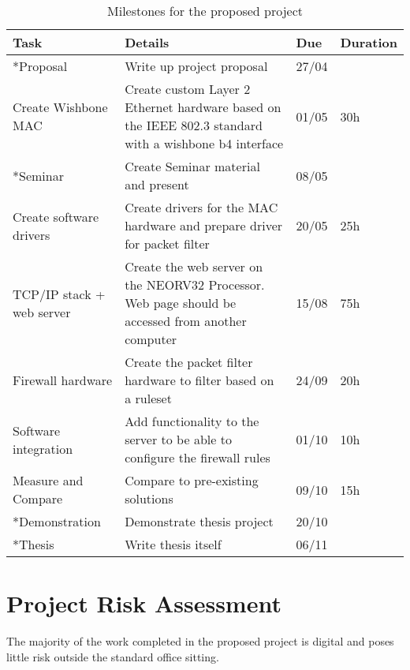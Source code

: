 \begin{table}[hbt!]
\centering%
    \begin{tabularx}{\textwidth}{ lXll }
        \hline
        Task                            & Details & Due & Duration  \\ \hline
        *Proposal                        & Write up project proposal & 27/04 & \\
        Create Wishbone MAC             &  Create custom Layer 2 Ethernet hardware based on the IEEE 802.3 standard with a wishbone b4 interface & 01/05  & 30h \\
        *Seminar                         & Create Seminar material and present & 08/05 & \\
        Create software drivers         & Create drivers for the MAC hardware and prepare driver for packet filter & 20/05 & 25h \\
        TCP/IP stack + web server       &  Create the web server on the NEORV32 Processor. Web page should be accessed from another computer  & 15/08     & 75h \\ 
        Firewall hardware               &  Create the packet filter hardware to filter based on a ruleset & 24/09    & 20h \\ 
        Software integration            &  Add functionality to the server to be able to configure the firewall rules & 01/10  & 10h \\ 
        Measure and Compare             &  Compare to pre-existing solutions  & 09/10     & 15h \\ 

        *Demonstration                   & Demonstrate thesis project & 20/10 & \\
        *Thesis                          & Write thesis itself & 06/11 & \\
        \hline
        \end{tabularx}
\caption{ Milestones for the proposed project}\label{table:milestones}
\end{table}
 

\newpage

\section{Project Risk Assessment}

The majority of the work completed in the proposed project is digital and poses little risk outside the standard office sitting. 

